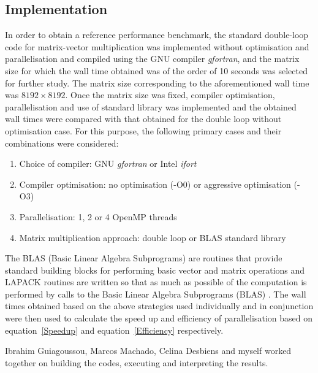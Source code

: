 \documentclass[11pt, oneside]{article}   	%
\begin{document}
\subsection{Implementation}
In order to obtain a reference performance benchmark, the standard double-loop code for matrix-vector multiplication was implemented without optimisation and parallelisation and compiled using the GNU compiler \textit{gfortran}, and the matrix size for which the wall time obtained was of the order of 10 seconds was selected for further study. The matrix size corresponding to the aforementioned wall time was \(8192\times8192\). Once the matrix size was fixed, compiler optimisation, parallelisation and use of standard library was implemented and the obtained wall times were compared with that obtained for the double loop without optimisation case. For this purpose, the following primary cases and their combinations were considered:
\begin{enumerate}
	\item{Choice of compiler: GNU \textit{gfortran} or Intel \textit{ifort}}
	\item{Compiler optimisation: no optimisation (-O0) or aggressive optimisation (-O3)}
	\item{Parallelisation: 1, 2 or 4 OpenMP threads}
	\item{Matrix multiplication approach: double loop or BLAS standard library}
\end{enumerate}

The BLAS (Basic Linear Algebra Subprograms) are routines that provide standard building blocks for performing basic vector and matrix operations \cite{Blackford:2002aa} and LAPACK routines are written so that as much as possible of the computation is performed by calls to the Basic Linear Algebra Subprograms (BLAS) \cite{Lawson:1979aa}. The wall times obtained based on the above strategies used individually and in conjunction were then used to calculate the speed up and efficiency of parallelisation based on equation~\ref{Speedup} and equation~\ref{Efficiency} respectively. 

Ibrahim Guiagoussou, Marcos Machado, Celina Desbiens and myself worked together on building the codes, executing and interpreting the results. 
	
\end{document}
